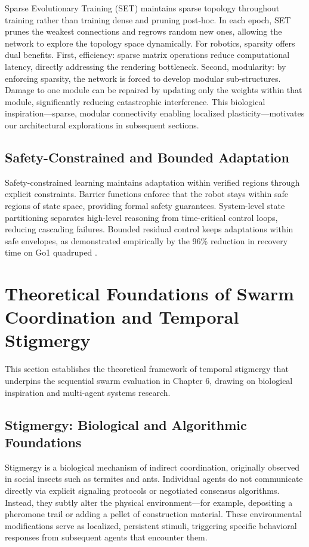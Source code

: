 ﻿\documentclass[12pt,a4paper,oneside]{report}
\begin{document}
Sparse Evolutionary Training (SET) maintains sparse topology throughout training rather than training dense and pruning post-hoc. In each epoch, SET prunes the weakest connections and regrows random new ones, allowing the network to explore the topology space dynamically. For robotics, sparsity offers dual benefits. First, efficiency: sparse matrix operations reduce computational latency, directly addressing the rendering bottleneck. Second, modularity: by enforcing sparsity, the network is forced to develop modular sub-structures. Damage to one module can be repaired by updating only the weights within that module, significantly reducing catastrophic interference. This biological inspiration---sparse, modular connectivity enabling localized plasticity---motivates our architectural explorations in subsequent sections.

\subsection{Safety-Constrained and Bounded Adaptation}

Safety-constrained learning maintains adaptation within verified regions through explicit constraints. Barrier functions enforce that the robot stays within safe regions of state space, providing formal safety guarantees. System-level state partitioning separates high-level reasoning from time-critical control loops, reducing cascading failures. Bounded residual control keeps adaptations within safe envelopes, as demonstrated empirically by the 96\% reduction in recovery time on Go1 quadruped \cite{jayasinghe2026residual}.

\section{Theoretical Foundations of Swarm Coordination and Temporal Stigmergy}

This section establishes the theoretical framework of temporal stigmergy that underpins the sequential swarm evaluation in Chapter 6, drawing on biological inspiration and multi-agent systems research.

\subsection{Stigmergy: Biological and Algorithmic Foundations}

Stigmergy is a biological mechanism of indirect coordination, originally observed in social insects such as termites and ants. Individual agents do not communicate directly via explicit signaling protocols or negotiated consensus algorithms. Instead, they subtly alter the physical environment---for example, depositing a pheromone trail or adding a pellet of construction material. These environmental modifications serve as localized, persistent stimuli, triggering specific behavioral responses from subsequent agents that encounter them.
\end{document}
